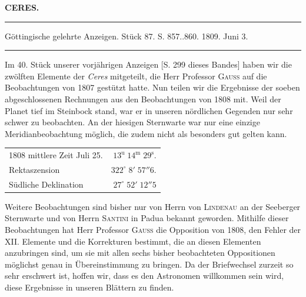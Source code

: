 \clearpage
{}
\hypertarget{native-317-lower}{}
\begin{center}
\textbf{CERES.}
\par\vspace{4pt}\hrule\vspace{4pt}
\fontsize{10}{12}\selectfont Göttingische gelehrte Anzeigen. Stück 87. S. 857..860. 1809. Juni 3.
\par\vspace{4pt}\hrule\vspace{4pt}
\end{center}

\par\indent Im 40. Stück unserer vorjährigen Anzeigen [S. 299 dieses Bandes] haben wir die zwölften Elemente der \emph{Ceres} mitgeteilt, die Herr Professor \textsc{Gauss} auf die Beobachtungen von 1807 gestützt hatte. Nun teilen wir die Ergebnisse der soeben abgeschlossenen Rechnungen aus den Beobachtungen von 1808 mit. Weil der Planet tief im Steinbock stand, war er in unseren nördlichen Gegenden nur sehr schwer zu beobachten. An der hiesigen Sternwarte war nur eine einzige Meridianbeobachtung möglich, die zudem nicht als besonders gut gelten kann.


\begin{center}\fontsize{10}{12}\selectfont\setlength{\tabcolsep}{5pt}\renewcommand{\arraystretch}{1.15}\begin{tabular}{lr} 1808 mittlere Zeit Juli 25. & $13^{\text{u}}\;14^{\text{m}}\;29^{\text{s}}$.\\ Rektaszension & $322^\circ\;8'\;57''6$.\\ Südliche Deklination & $27^\circ\;52'\;12''5$\\
\end{tabular}\end{center}


\par\indent Weitere Beobachtungen sind bisher nur von Herrn von \textsc{Lindenau} an der Seeberger Sternwarte und von Herrn \textsc{Santini} in Padua bekannt geworden. Mithilfe dieser Beobachtungen hat Herr Professor \textsc{Gauss} die Opposition von 1808, den Fehler der XII. Elemente und die Korrekturen bestimmt, die an diesen Elementen anzubringen sind, um sie mit allen sechs bisher beobachteten Oppositionen möglichst genau in Übereinstimmung zu bringen. Da der Briefwechsel zurzeit so sehr erschwert ist, hoffen wir, dass es den Astronomen willkommen sein wird, diese Ergebnisse in unseren Blättern zu finden.

